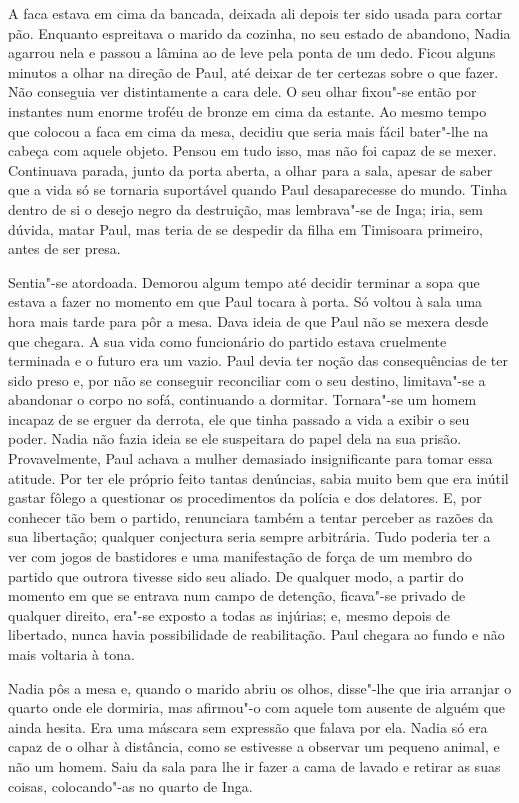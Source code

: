 A faca estava em cima da bancada, deixada ali depois ter sido usada para
cortar pão. Enquanto espreitava o marido da cozinha, no seu estado de
abandono, Nadia agarrou nela e passou a lâmina ao de leve pela ponta de
um dedo. Ficou alguns minutos a olhar na direção de Paul, até deixar de
ter certezas sobre o que fazer. Não conseguia ver distintamente a cara
dele. O seu olhar fixou"-se então por instantes num enorme troféu de
bronze em cima da estante. Ao mesmo tempo que colocou a faca em cima da
mesa,
decidiu que seria mais fácil bater"-lhe na cabeça com aquele objeto.
Pensou em tudo isso, mas não foi capaz de se mexer. Continuava parada,
junto da porta aberta, a olhar para a sala, apesar de saber que a vida
só se tornaria suportável quando Paul desaparecesse do mundo. Tinha
dentro de si o desejo negro da destruição, mas lembrava"-se de Inga;
iria, sem dúvida, matar Paul, mas teria de se despedir da filha em
Timisoara primeiro, antes de ser presa.

Sentia"-se atordoada. Demorou algum tempo até decidir terminar a sopa que
estava a fazer no momento em que Paul tocara à porta. Só voltou à sala
uma hora mais tarde para pôr a mesa. Dava ideia de que Paul não se
mexera desde que chegara. A sua vida como funcionário do partido
estava cruelmente terminada e o futuro era um vazio. Paul devia ter
noção das consequências de ter sido preso e, por não se conseguir
reconciliar com o seu destino, limitava"-se a abandonar o corpo no sofá,
continuando a dormitar. Tornara"-se um homem incapaz de se erguer da
derrota, ele que tinha passado a vida a exibir o seu poder. Nadia não
fazia ideia se ele suspeitara do papel dela na sua prisão.
Provavelmente, Paul achava a mulher demasiado insignificante para
tomar essa atitude. Por ter ele próprio feito tantas denúncias, sabia
muito bem que era inútil gastar fôlego a questionar os procedimentos da
polícia e dos delatores. E, por conhecer tão bem o partido, renunciara
também a tentar perceber as razões da sua libertação; qualquer
conjectura seria sempre arbitrária. Tudo poderia ter a ver com jogos de
bastidores e uma manifestação de força de um membro do partido que
outrora tivesse sido seu aliado. De qualquer modo, a partir do momento em que se entrava num campo de detenção, ficava"-se
privado de qualquer direito, era"-se exposto a todas as injúrias; e,
mesmo depois de libertado, nunca havia possibilidade de reabilitação.
Paul chegara ao fundo e não mais voltaria à tona.

Nadia pôs a mesa e, quando o marido abriu os olhos, disse"-lhe que iria
arranjar o quarto onde ele dormiria, mas afirmou"-o com aquele tom
ausente de alguém que ainda hesita. Era uma máscara sem expressão que
falava por ela. Nadia só era capaz de o olhar à distância, como se estivesse a observar um pequeno animal, e não um homem. Saiu da sala para
lhe ir fazer a cama de lavado e retirar as suas coisas, colocando"-as no
quarto de Inga.

